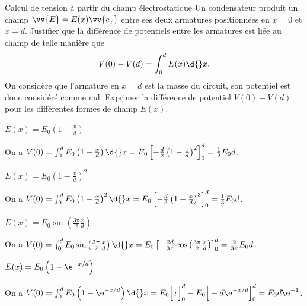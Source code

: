 \begin{exo}[PC][1][appli]{Calcul de tension à partir du champ électrostatique}
\hauteurLargeurCadreReponse{7mm}{11cm}
Un condensateur produit un champ $\vv{E} = E(x)\vv{e_x}$ entre ses deux armatures positionnées en $x = 0$ et $x = d$. Justifier que la différence de potentiels entre les armatures est liée au champ de telle manière que \vspace{-1mm}
\begin{equation}
  V(0) - V(d) = \int_{0}^{d} E(x) \d{}x.\vspace{-1mm}
\end{equation}
On considère que l'armature en $x=d$ est la masse du circuit, son potentiel est donc considéré comme nul.
Exprimer la différence de potentiel $V(0)-V(d)$ pour les différentes formes de champ $E(x)$.

  \begin{enonce}
  	$E(x) = E_0 \left( 1 - \frac{x}{d} \right)$
  \end{enonce}
  \begin{corrige}
  On a $V(0) = \int_{0}^{d} E_0 \left( 1 - \frac{x}{d} \right) \d{}x = E_0 \left[ -\frac{d}{2}\left( 1 - \frac{x}{d} \right)^2  \right]^{d}_{0} = \frac{1}{2}E_0d$.
  \end{corrige}

  \begin{enonce}
  	$E(x) = E_0 \left( 1 - \frac{x}{d} \right)^2$
  \end{enonce}
  \begin{corrige}
  On a $V(0) = \int_{0}^{d} E_0 \left( 1 - \frac{x}{d} \right)^2 \d{}x = E_0 \left[ -\frac{d}{3}\left( 1 - \frac{x}{d} \right)^3  \right]^{d}_{0} = \frac{1}{3}E_0d$.
  \end{corrige}

  \begin{enonce}
  	$E(x) = E_0 \sin\left( \frac{3\pi}{2}\frac{x}{d} \right)$
  \end{enonce}
  \begin{corrige}
  On a $V(0) = \int_{0}^{d} E_0 \sin\left( \frac{3\pi}{2}\frac{x}{d} \right) \d{}x = E_0 \left[ -\frac{2d}{3\pi}\cos\left( \frac{3\pi}{2}\frac{x}{d} \right)  \right]^{d}_{0} = \frac{2}{3\pi}E_0d$.
  \end{corrige}

  \begin{enonce}
  	$E(x) = E_0 \left( 1 - \e^{-x/d} \right)$
  \end{enonce}
  \begin{corrige}
    On a $V(0) = \int_{0}^{d} E_0 \left( 1 - \e^{-x/d} \right) \d{}x =
    E_0 \Big[ x  \Big]^{d}_{0} - E_0 \Big[ -d\e^{-x/d}  \Big]^{d}_{0} = E_0d\e^{-1}$.
  \end{corrige}

\end{exo}

